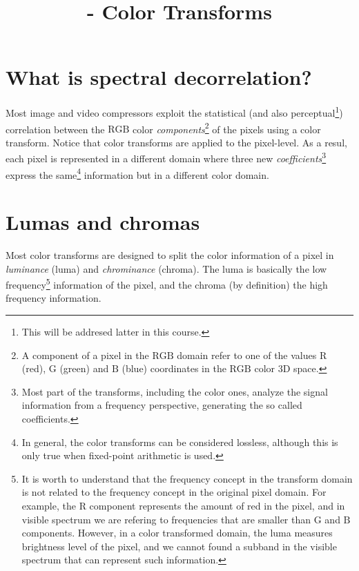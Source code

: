 

\title{\SM{} - Color Transforms}

\maketitle
\tableofcontents

\section{What is spectral decorrelation?}

Most image and video compressors exploit the statistical (and also
perceptual\footnote{This will be addresed latter in this course.})
correlation between the $\text{RGB}$ color
\emph{components}\footnote{A component of a pixel in the $\text{RGB}$
domain refer to one of the values $\text{R}$ (red), $\text{G}$ (green)
and $\text{B}$ (blue) coordinates in the $\text{RGB}$ color 3D space.}
of the pixels using a color transform. Notice that color transforms
are applied to the pixel-level. As a resul, each pixel is represented
in a different domain where three new
\emph{coefficients}\footnote{Most part of the transforms, including
the color ones, analyze the signal information from a frequency
perspective, generating the so called coefficients.} express the
same\footnote{In general, the color transforms can be considered
lossless, although this is only true when fixed-point arithmetic is
used.} information but in a different color domain.

\section{Lumas and chromas}

Most color transforms are designed to split the color information of a
pixel in \emph{luminance} (luma) and \emph{chrominance} (chroma). The
luma is basically the low frequency\footnote{It is worth to understand
that the frequency concept in the transform domain is not related to
the frequency concept in the original pixel domain. For example, the
$\text{R}$ component represents the amount of red in the pixel, and in
visible spectrum we are refering to frequencies that are smaller than
$\text{G}$ and $\text{B}$ components. However, in a color transformed
domain, the luma measures brightness level of the pixel, and we cannot
found a subband in the visible spectrum that can represent such
information.} information of the pixel, and the chroma (by definition)
the high frequency information.


